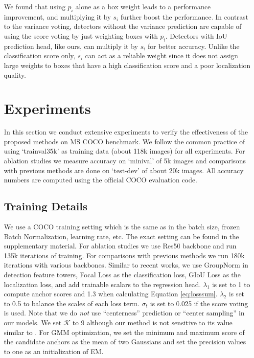 \documentclass[runningheads]{llncs}
\begin{document}
We found that using $p_i$ alone as a box weight leads to a performance improvement, and multiplying it by $s_i$ further boost the performance. In contrast to the variance voting, detectors without the variance prediction are capable of using the score voting by just weighting boxes with $p_i$. Detectors with IoU prediction head, like ours, can multiply it by $s_i$ for better accuracy. Unlike the classification score only, $s_i$ can act as a reliable weight since it does not assign large weights to boxes that have a high classification score and a poor localization quality.

\section{Experiments}
\label{experiments}
In this section we conduct extensive experiments to verify the effectiveness of the proposed methods on MS COCO benchmark\cite{coco}. We follow the common practice of using `trainval35k' as training data (about 118k images) for all experiments. For ablation studies we measure accuracy on `minival' of 5k images and comparisons with previous methods are done on `test-dev' of about 20k images. All accuracy numbers are computed using the official COCO evaluation code.

\subsection{Training Details}
We use a COCO training setting which is the same as \cite{atss} in the batch size, frozen Batch Normalization, learning rate, etc. The exact setting can be found in the supplementary material. For ablation studies we use Res50 backbone and run 135k iterations of training. For comparisons with previous methods we run 180k iterations with various backbones. Similar to recent works\cite{fcos, atss}, we use GroupNorm\cite{groupnorm} in detection feature towers, Focal Loss\cite{focal} as the classification loss, GIoU Loss\cite{giou} as the localization loss, and add trainable scalars to the regression head. $\lambda_1$ is set to 1 to compute anchor scores and 1.3 when calculating Equation \ref{eq:losssum}. $\lambda_2$ is set to 0.5 to balance the scales of each loss term. $\sigma_t$ is set to 0.025 if the score voting is used. Note that we do \textit{not} use ``centerness'' prediction or ``center sampling''\cite{fcos, atss} in our models. We set $\mathcal{K}$ to 9 although our method is not sensitive to its value similar to \cite{atss}. For GMM optimization, we set the minimum and maximum score of the candidate anchors as the mean of two Gaussians and set the precision values to one as an initialization of EM.
\end{document}
